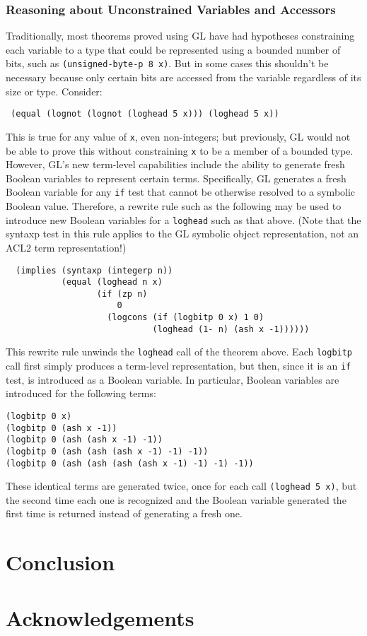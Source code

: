 \documentclass[submission,copyright,creativecommons]{eptcs}
\begin{document}
\subsubsection{Reasoning about Unconstrained Variables and Accessors}
Traditionally, most theorems proved using GL have had hypotheses
constraining each variable to a type that could be represented using a
bounded number of bits, such as \texttt{(unsigned-byte-p 8 x)}.  But
in some cases this shouldn't be necessary because only certain bits
are accessed from the variable regardless of its size or type.
Consider:
\begin{verbatim}
 (equal (lognot (lognot (loghead 5 x))) (loghead 5 x))
\end{verbatim}
This is true for any value of \texttt{x}, even non-integers; but
previously, GL would not be able to prove this without constraining
\texttt{x} to be a member of a bounded type.  However, GL's new
term-level capabilities include the ability to generate fresh Boolean
variables to represent certain terms.  Specifically, GL generates a
fresh Boolean variable for any \texttt{if} test that cannot be
otherwise resolved to a symbolic Boolean value.  Therefore, a rewrite
rule such as the following may be used to introduce new Boolean
variables for a \texttt{loghead} such as that above.  (Note that the
syntaxp test in this rule applies to the GL symbolic object
representation, not an ACL2 term representation!)
\begin{verbatim}
  (implies (syntaxp (integerp n))
           (equal (loghead n x)
                  (if (zp n)
                      0
                    (logcons (if (logbitp 0 x) 1 0)
                             (loghead (1- n) (ash x -1))))))
\end{verbatim}
This rewrite rule unwinds the \texttt{loghead} call of the theorem
above.  Each \texttt{logbitp} call first simply produces a term-level
representation, but then, since it is an \texttt{if} test, is
introduced as a Boolean variable.  In particular, Boolean variables
are introduced for the following terms:
\begin{verbatim}
(logbitp 0 x)
(logbitp 0 (ash x -1))
(logbitp 0 (ash (ash x -1) -1))
(logbitp 0 (ash (ash (ash x -1) -1) -1))
(logbitp 0 (ash (ash (ash (ash x -1) -1) -1) -1))
\end{verbatim}
These identical terms are generated twice, once for each call
\texttt{(loghead 5 x)}, but the second time each one is recognized and
the Boolean variable generated the first time is returned instead of
generating a fresh one.





\section{Conclusion}
\label{sec:conclusion}


\section*{Acknowledgements}



\end{document}
